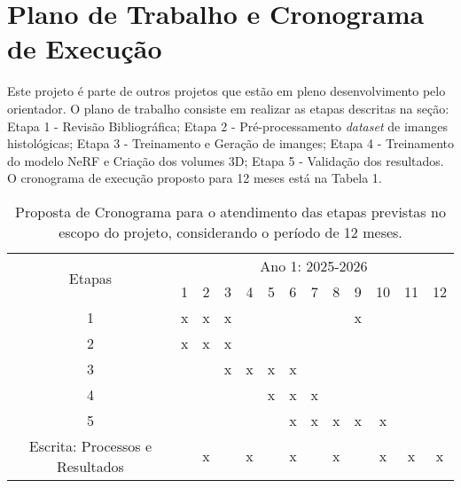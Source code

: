 \section{Plano de Trabalho e Cronograma de Execução}

Este projeto é parte de outros projetos que estão em pleno desenvolvimento pelo orientador. O plano de trabalho consiste em realizar as etapas descritas na seção: Etapa 1 - Revisão Bibliográfica; Etapa 2 - Pré-processamento \textit{dataset} de imanges histológicas; Etapa 3 - Treinamento e Geração de imanges; Etapa 4 - Treinamento do modelo NeRF e Criação dos volumes 3D; Etapa 5 - Validação dos resultados. O cronograma de execução proposto para 12 meses está na Tabela 1. 

\begin{table}[h]
\caption{Proposta de Cronograma para o atendimento das etapas previstas no escopo do projeto, considerando o período de 12 meses.}
\label{tab:cronograma}
    \centering
        \begin{tabular}{|c|c|c|c|c|c|c|c|c|c|c|c|c|}
        \hline
        \multirow{2}{*}{Etapas}
        &\multicolumn{12}{c|}{Ano 1: 2025-2026}\\ \cline{2-13}
        &1&2&3&4&5&6&7&8&9&10&11&12\\
        \hline
        1&x&x&x&&&&&&x&&&\\
        \hline
        2&x&x&x&&&&&&&&&\\
        \hline      
        3&&&x&x&x&x&&&&&&\\
        \hline              
        4&&&&&x&x&x&&&&&\\
        \hline     
        5&&&&&&x&x&x&x&x&&\\
        \hline     
        Escrita: Processos e Resultados&&x&&x&&x&&x&&x&x&x\\
        \hline
        \end{tabular}
\end{table}
